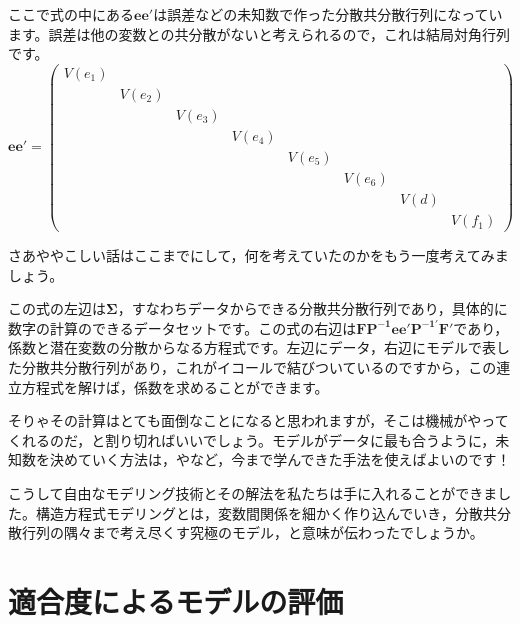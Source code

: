 \documentclass{ltjsbook}
\begin{document}
ここで式の中にある$\bm{ee'}$は誤差などの未知数で作った分散共分散行列になっています。誤差は他の変数との共分散がないと考えられるので，これは結局対角行列です。
\[
	\bm{ee'}= \begin{pmatrix} V(e_1) &        &        &        &        &        &        &        \\
                               & V(e_2) &        &        &        &        &        &        \\
                               &        & V(e_3) &        &        &        &        &        \\
                               &        &        & V(e_4) &        &        &        &        \\
                               &        &        &        & V(e_5) &        &        &        \\
                               &        &        &        &        & V(e_6) &        &        \\
                               &        &        &        &        &        & V(d)   &        \\
                               &        &        &        &        &        &        & V(f_1)\end{pmatrix}
\]

さあややこしい話はここまでにして，何を考えていたのかをもう一度考えてみましょう。

この式の左辺は$\bm{\Sigma}$，すなわちデータからできる分散共分散行列であり，具体的に数字の計算のできるデータセットです。この式の右辺は$\bm{ FP^{-1} ee' P^{-1'} F' } $であり，係数と潜在変数の分散からなる方程式です。左辺にデータ，右辺にモデルで表した分散共分散行列があり，これがイコールで結びついているのですから，この連立方程式を解けば，係数を求めることができます。

そりゃその計算はとても面倒なことになると思われますが，そこは機械がやってくれるのだ，と割り切ればいいでしょう。モデルがデータに最も合うように，未知数を決めていく方法は，やなど，今まで学んできた手法を使えばよいのです！

こうして自由なモデリング技術とその解法を私たちは手に入れることができました。構造方程式モデリングとは，変数間関係を細かく作り込んでいき，分散共分散行列の隅々まで考え尽くす究極のモデル，と意味が伝わったでしょうか。

\section{適合度によるモデルの評価}
\end{document}
